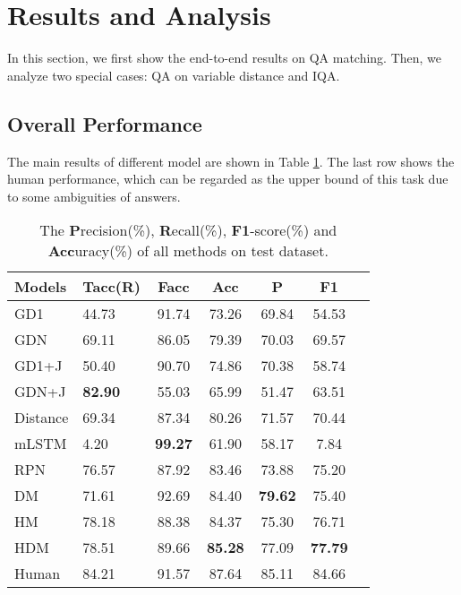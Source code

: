 \section{Results and Analysis}
\label{sec:results}

In this section, we first show the end-to-end results on QA matching. Then, we analyze two special cases: QA on variable distance and IQA.

\subsection{Overall Performance}
The main results of different model are shown in Table \ref{tab:mainResults}. The last row shows the human performance, which can be regarded as the upper bound of this task due to some ambiguities of answers. 

\begin{table}[h]
	\small
	\centering
	\begin{tabular}{p{1cm}<{\centering}p{1cm}<{\centering}ccccc}
		\toprule[1.5pt]
		Models &Tacc(R)&Facc& Acc& P& F1\\
		\midrule[1pt]
		GD1&44.73&91.74&73.26&69.84&54.53\\
		GDN  &69.11&86.05&79.39&70.03&69.57\\
		GD1+J&50.40&90.70&74.86&70.38&58.74\\
		GDN+J&\textbf{82.90}&55.03&65.99&51.47&63.51\\
		\hline
		Distance&69.34&87.34&80.26&71.57&70.44\\
		mLSTM&4.20&\textbf{99.27}&61.90&58.17&7.84\\
		RPN&76.57&87.92&83.46&73.88&75.20\\
		\hline
		DM&71.61&92.69&84.40&\textbf{79.62}&75.40\\
		HM&78.18&88.38&84.37&75.30&76.71\\
		HDM&78.51&89.66&\textbf{85.28}&77.09&\textbf{77.79}\\
		\hline
		Human & 84.21&91.57&87.64&85.11&84.66\\
		\bottomrule[1.5pt]
	\end{tabular}
	\caption{The \textbf{P}recision(\%), \textbf{R}ecall(\%), \textbf{F1}-score(\%) and \textbf{Acc}uracy(\%) of all methods on test dataset.}
	\label{tab:mainResults}
\end{table}




